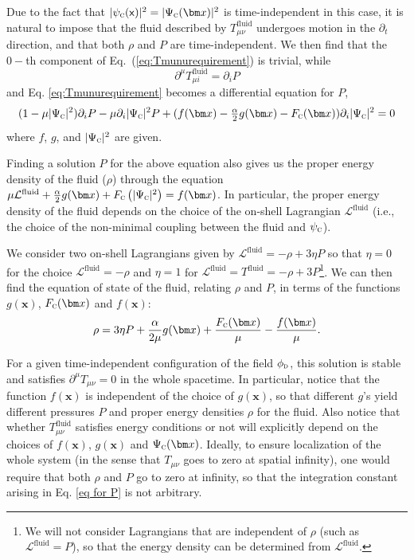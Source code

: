 \documentclass[letterpaper,12pt,titlepage,oneside,final]{book}
\newcommand{\mf}{\mathsf}%
\newcommand{\tc}[1]{\textsc{#1}}
\begin{document}
Due to the fact that $|\psi_\tc{c}(\mf x)|^2 = |\Psi_\tc{c}(\bm x)|^2$ is time-independent in this case, it is natural to impose that the fluid described by $T^\textrm{fluid}_{\mu\nu}$ undergoes motion in the $\partial_t$ direction, and that both $\rho$ and $P$ are time-independent. We then find that the $0-$th component of Eq.~(\ref{eq:Tmunurequirement}) is trivial, while
\begin{equation}
    \partial^\mu T^\textrm{fluid}_{\mu i } = \partial_i  P
\end{equation}
and Eq. \eqref{eq:Tmunurequirement} becomes a differential equation for $P$, 
\begin{equation}
\begin{aligned}
    (1-\mu |\Psi_\tc{c}|^2)\partial_i P - \mu  \partial_i|\Psi_\tc{c}|^2 P+(f(\bm x) -\tfrac{\alpha}{2}g(\bm x) -F_\tc{c}(\bm x))\partial_i |\Psi_\tc{c}|^2 = 0
\end{aligned}
\label{eq for P}
\end{equation}
where $f$, $g$, and $|\Psi_\tc{c}|^2$ are given.

Finding a solution $P$ for the above equation also gives us the proper energy density of the fluid ($\rho$) through the equation $\mu \mathcal{L}^\textrm{fluid} + \frac{\alpha}{2}g(\bm x) +F_\tc{c}\left(|\Psi_\tc{c}|^2\right)= f(\bm x)$. In particular, the proper energy density of the fluid depends on the choice of the on-shell Lagrangian $\mathcal{L}^\textrm{fluid}$ (i.e., the choice of the non-minimal coupling between the fluid and $\psi_\tc{c}$).

We consider two on-shell Lagrangians given by \mbox{$\mathcal{L}^\textrm{fluid}=-\rho+3\eta P$} so that \mbox{$\eta=0$} for the choice \mbox{$\mathcal{L}^\textrm{fluid}=-\rho$} and $\eta=1$ for \mbox{$\mathcal{L}^\textrm{fluid}=T^{\textrm{fluid}}=-\rho+3P$}\footnote{We will not consider Lagrangians that are independent of $\rho$ (such as $\mathcal{L}^\textrm{fluid} = P$), so that the energy density can be determined from $\mathcal{L}^\textrm{fluid}$.}.  We can then find the equation of state of the fluid, relating $\rho$ and $P$, in terms of the functions $g(\bm x)$, $F_\tc{c}(\bm x)$ and $f(\bm x)$: 
\begin{equation}
    \rho = 3 \eta P + \frac{\alpha}{2 \mu}g(\bm x) + \frac{F_{\tc{c}}(\bm x)}{\mu}  - \frac{f(\bm x)}{\mu}.
    \label{eq for rho}
\end{equation}

For a given time-independent configuration of the field $\phi_\tc{d}$, this solution is stable and satisfies $\partial^\mu T_{\mu\nu} = 0$ in the whole spacetime. In particular, notice that the function $f(\bm x)$ is independent of the choice of $g(\bm x)$, so that different $g$'s yield different pressures $P$ and proper energy densities $\rho$ for the fluid. Also notice that whether $T^{\textrm{fluid}}_{\mu\nu}$ satisfies energy conditions or not will explicitly depend on the choices of $f(\bm x)$, $g(\bm x)$ and $\Psi_\tc{c}(\bm x)$. Ideally, to ensure localization of the whole system (in the sense that $T_{\mu\nu}$ goes to zero at spatial infinity), one would require that both $\rho$ and $P$ go to zero at infinity, so that the integration constant arising in Eq. \eqref{eq for P} is not arbitrary.
\end{document}
